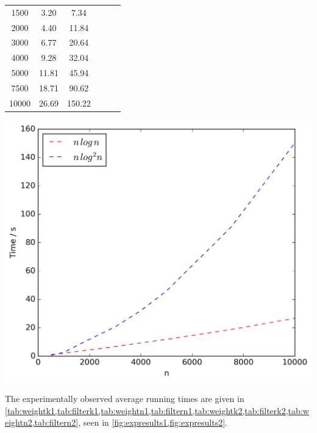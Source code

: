 \documentclass{article}
\begin{document}
\begin{table}[!ht]
\begin{minipage}{0.48\textwidth}
\begin{tabular}{c||ccccc}
                1500 & 3.20 & 7.34\\
                2000 & 4.40 & 11.84\\
                3000 & 6.77 & 20.64\\
                4000 & 9.28 & 32.04\\
                5000 & 11.81 & 45.94\\
                7500 & 18.71 & 90.62\\
                10000 & 26.69 & 150.22\\
            \end{tabular}
            \includegraphics[scale=0.4]{varyingn2_filter}
        \end{minipage}
        \label{fig:expresults2}
    \end{table}

    The experimentally observed average running times are given in \cref{tab:weightk1,tab:filterk1,tab:weightn1,tab:filtern1,tab:weightk2,tab:filterk2,tab:weightn2,tab:filtern2}, seen in \cref{fig:expresults1,fig:expresults2}.
\end{document}
